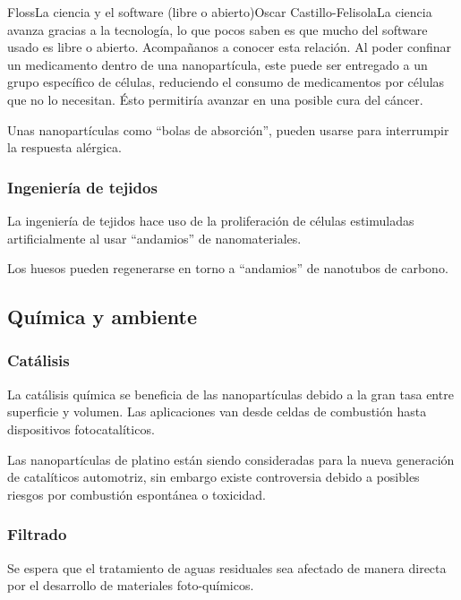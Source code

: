 \begin{article}[2]{Floss}{La ciencia y el software (libre o abierto)}{Oscar Castillo-Felisola}{La ciencia avanza gracias a la tecnolog\'ia, lo que pocos saben es que mucho del software usado es libre o abierto. Acompa\~nanos a conocer esta relaci\'on.}
Al poder confinar un medicamento dentro de una nanopart\'icula, este puede ser entregado a un grupo espec\'ifico de c\'elulas, reduciendo el consumo de medicamentos por c\'elulas que no lo necesitan. \'Esto permitir\'ia avanzar en una posible %
cura del c\'ancer.

Unas nanopart\'iculas como ``bolas de absorci\'on'', pueden usarse para interrumpir la respuesta al\'ergica. 


\subsubsection*{Ingenier\'ia de tejidos}

La ingenier\'ia de tejidos hace uso de la proliferaci\'on de c\'elulas estimuladas artificialmente al usar ``andamios'' de nanomateriales.

Los huesos pueden regenerarse en torno a ``andamios'' de nanotubos de carbono.

\subsection{Qu\'imica y ambiente}

\subsubsection*{Cat\'alisis}

La cat\'alisis qu\'imica se beneficia de las nanopart\'iculas debido a la gran tasa entre superficie y volumen. Las aplicaciones van desde celdas de combusti\'on hasta dispositivos fotocatal\'iticos.

Las nanopart\'iculas de platino est\'an siendo consideradas para la nueva generaci\'on de catal\'iticos automotriz, sin embargo existe controversia debido a posibles riesgos por combusti\'on espont\'anea o toxicidad.

\subsubsection*{Filtrado}

Se espera que el tratamiento de aguas residuales sea afectado de manera directa por el desarrollo de materiales foto-qu\'imicos.


\end{article}
